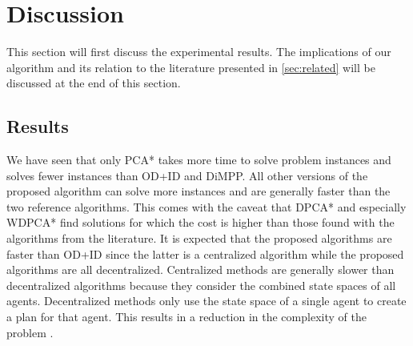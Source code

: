 \section{Discussion}\label{sec:discussion}
This section will first discuss the experimental results. The implications of 
our algorithm and its relation to the literature presented in 
\autoref{sec:related} will be discussed at the end of this section.


\subsection{Results}

We have seen that only PCA* takes more time to solve problem instances and
solves fewer instances than OD+ID and DiMPP. All other versions of the proposed
algorithm can solve more
instances and are generally faster than the two reference algorithms. This
comes with the caveat that DPCA* and especially WDPCA* find solutions for which 
the cost is higher than those found with the algorithms from the literature. It 
is expected that the proposed algorithms are faster than OD+ID
since the latter is a centralized algorithm while the proposed algorithms are
all decentralized. Centralized methods are generally slower than decentralized
algorithms because they consider the combined state spaces
of all agents. Decentralized methods only use the state space of a single agent
to create a plan for that agent. This results in a reduction in the complexity
of the problem \cite{bennewitz2002,sharon2013}.


